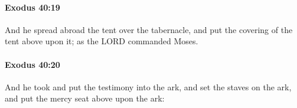 		\paragraph{Exodus 40:19} %
			\label{EXODUS-40-19}

			And he spread abroad the tent over the tabernacle, and put the covering of the tent above upon it; as the LORD commanded Moses.


		\paragraph{Exodus 40:20} %
			\label{EXODUS-40-20}

			And he took and put the testimony into the ark, and set the staves on the ark, and put the mercy seat above upon the ark:


